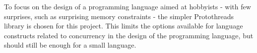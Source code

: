 To focus on the design of a programming language aimed at hobbyists - with few surprises, such as surprising memory constraints - the simpler Protothreads library is chosen for this project. This limits the options available for language constructs related to concurrency in the design of the programming language, but should still be enough for a small language.